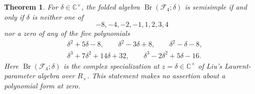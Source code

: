 \documentclass[11pt,a4paper]{amsart}
\newcommand{\Br}{\operatorname{Br}}\newcommand{\Irr}{\operatorname{Irr}}
\newtheorem{theorem}{Theorem}[section]
\theoremstyle{uprightdefinition}
\theoremstyle{remark}\newtheorem{remark}[theorem]{Remark}
\begin{document}
\begin{theorem}\label{thm:f4-certified}
For $\delta\in\mathbb C^\times$, the folded algebra $\Br(\mathscr{F}_4;\delta)$ is
semisimple if and only if $\delta$ is neither one of
\[
 -8,-4,-2,-1,1,2,3,4
\]
nor a zero of any of the five polynomials
\begin{equation}\label{eq:f4-nonlinear}
\begin{split}
 &\delta^2+5\delta-8,\qquad \delta^2-3\delta+8,\qquad
       \delta^2-\delta-8,\\
 &\delta^3+7\delta^2+14\delta+32,\qquad
       \delta^3-2\delta^2+5\delta-16.
\end{split}
\end{equation}
Here $\Br(\mathscr{F}_4;\delta)$ is the complex specialization at
$z=\delta\in\mathbb C^\times$ of Liu's Laurent-parameter algebra over
$R_\times$. This statement makes no assertion about a polynomial form at zero.
\end{theorem}
\end{document}
